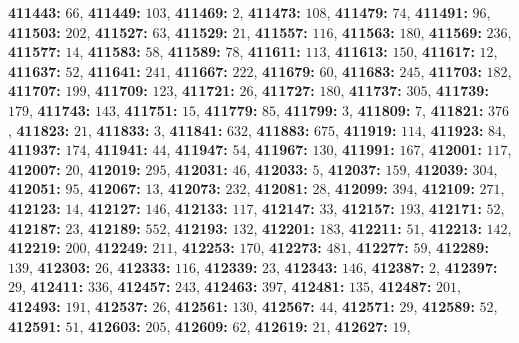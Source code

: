 \textsf{\bfseries 411443:} $66$, \textsf{\bfseries 411449:} $103$, \textsf{\bfseries 411469:} $2$, \textsf{\bfseries 411473:} $108$, \textsf{\bfseries 411479:} $74$, \textsf{\bfseries 411491:} $96$, \textsf{\bfseries 411503:} $202$, \textsf{\bfseries 411527:} $63$, \textsf{\bfseries 411529:} $21$, \textsf{\bfseries 411557:} $116$, \textsf{\bfseries 411563:} $180$, \textsf{\bfseries 411569:} $236$, \textsf{\bfseries 411577:} $14$, \textsf{\bfseries 411583:} $58$, \textsf{\bfseries 411589:} $78$, \textsf{\bfseries 411611:} $113$, \textsf{\bfseries 411613:} $150$, \textsf{\bfseries 411617:} $12$, \textsf{\bfseries 411637:} $52$, \textsf{\bfseries 411641:} $241$, \textsf{\bfseries 411667:} $222$, \textsf{\bfseries 411679:} $60$, \textsf{\bfseries 411683:} $245$, \textsf{\bfseries 411703:} $182$, \textsf{\bfseries 411707:} $199$, \textsf{\bfseries 411709:} $123$, \textsf{\bfseries 411721:} $26$, \textsf{\bfseries 411727:} $180$, \textsf{\bfseries 411737:} $305$, \textsf{\bfseries 411739:} $179$, \textsf{\bfseries 411743:} $143$, \textsf{\bfseries 411751:} $15$, \textsf{\bfseries 411779:} $85$, \textsf{\bfseries 411799:} $3$, \textsf{\bfseries 411809:} $7$, \textsf{\bfseries 411821:} $376$, \textsf{\bfseries 411823:} $21$, \textsf{\bfseries 411833:} $3$, \textsf{\bfseries 411841:} $632$, \textsf{\bfseries 411883:} $675$, \textsf{\bfseries 411919:} $114$, \textsf{\bfseries 411923:} $84$, \textsf{\bfseries 411937:} $174$, \textsf{\bfseries 411941:} $44$, \textsf{\bfseries 411947:} $54$, \textsf{\bfseries 411967:} $130$, \textsf{\bfseries 411991:} $167$, \textsf{\bfseries 412001:} $117$, \textsf{\bfseries 412007:} $20$, \textsf{\bfseries 412019:} $295$, \textsf{\bfseries 412031:} $46$, \textsf{\bfseries 412033:} $5$, \textsf{\bfseries 412037:} $159$, \textsf{\bfseries 412039:} $304$, \textsf{\bfseries 412051:} $95$, \textsf{\bfseries 412067:} $13$, \textsf{\bfseries 412073:} $232$, \textsf{\bfseries 412081:} $28$, \textsf{\bfseries 412099:} $394$, \textsf{\bfseries 412109:} $271$, \textsf{\bfseries 412123:} $14$, \textsf{\bfseries 412127:} $146$, \textsf{\bfseries 412133:} $117$, \textsf{\bfseries 412147:} $33$, \textsf{\bfseries 412157:} $193$, \textsf{\bfseries 412171:} $52$, \textsf{\bfseries 412187:} $23$, \textsf{\bfseries 412189:} $552$, \textsf{\bfseries 412193:} $132$, \textsf{\bfseries 412201:} $183$, \textsf{\bfseries 412211:} $51$, \textsf{\bfseries 412213:} $142$, \textsf{\bfseries 412219:} $200$, \textsf{\bfseries 412249:} $211$, \textsf{\bfseries 412253:} $170$, \textsf{\bfseries 412273:} $481$, \textsf{\bfseries 412277:} $59$, \textsf{\bfseries 412289:} $139$, \textsf{\bfseries 412303:} $26$, \textsf{\bfseries 412333:} $116$, \textsf{\bfseries 412339:} $23$, \textsf{\bfseries 412343:} $146$, \textsf{\bfseries 412387:} $2$, \textsf{\bfseries 412397:} $29$, \textsf{\bfseries 412411:} $336$, \textsf{\bfseries 412457:} $243$, \textsf{\bfseries 412463:} $397$, \textsf{\bfseries 412481:} $135$, \textsf{\bfseries 412487:} $201$, \textsf{\bfseries 412493:} $191$, \textsf{\bfseries 412537:} $26$, \textsf{\bfseries 412561:} $130$, \textsf{\bfseries 412567:} $44$, \textsf{\bfseries 412571:} $29$, \textsf{\bfseries 412589:} $52$, \textsf{\bfseries 412591:} $51$, \textsf{\bfseries 412603:} $205$, \textsf{\bfseries 412609:} $62$, \textsf{\bfseries 412619:} $21$, \textsf{\bfseries 412627:} $19$, 

